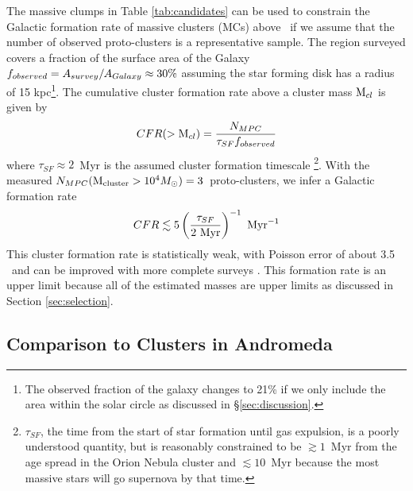 The massive clumps in Table \ref{tab:candidates} can be used to constrain the
Galactic formation rate of massive clusters (MCs) above \mmin\ if we assume
that the number of observed proto-clusters is a representative sample. The region
surveyed covers a fraction of the surface area of the Galaxy
$f_{observed}=A_{survey} / A_{Galaxy} \approx 30\%$ assuming the star
forming disk has a radius of 15 kpc\footnote{The observed fraction of the
galaxy changes to 21\% if we only include the area within the solar
circle as discussed in \S \ref{sec:discussion}.}.
The cumulative
cluster formation rate above a cluster mass ${\rm M}_{cl}$ is given by $$CFR(>{\rm M}_{cl})
= \frac{N_{MPC}}{\tau_{SF} f_{observed}}$$ where $ \tau_{SF} \approx 2$\ Myr is
the assumed cluster formation timescale \footnote{$\tau_{SF}$, the time from the start of star formation
until gas expulsion, is a poorly understood
quantity, but is reasonably constrained to be $\gtrsim1$~Myr from the age
spread in the Orion Nebula cluster \citep{Hillenbrand1997} and $\lesssim10$~Myr
because the most massive stars will go supernova by that time.}.
With the measured
$N_{MPC}({\rm M}_{\rm cluster}>10^4M_{\odot}) = 3 $\ proto-clusters, we infer a Galactic formation rate 
$$CFR \lesssim 5 \left(\frac{\tau_{SF}}{2
~\textrm{Myr}}\right)^{-1} \textrm{~Myr}^{-1}$$  This cluster formation rate is
statistically weak, with Poisson error of about 3.5 
\permyr\ and can be improved with more complete surveys \citep[e.g., Hi-Gal,][]{Molinari2010}.  This
formation rate is an upper limit because all of the estimated
masses are upper limits as discussed in Section \ref{sec:selection}.


\subsection{Comparison to Clusters in Andromeda}
%

